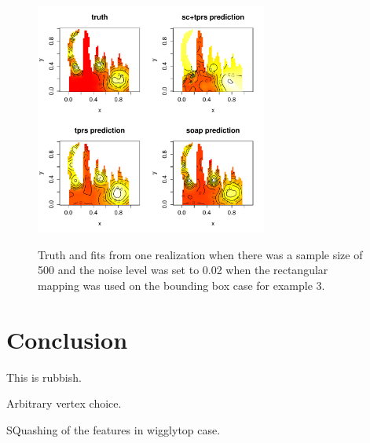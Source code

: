 \documentclass[a4paper,10pt]{amsart}
\begin{document}
\begin{figure}
\centering
\includegraphics[width=3in]{figs-otherdomains/wigglytop2-bbox-real.pdf} \\
\caption{Truth and fits from one realization when there was a sample size of 500 and the noise level was set to 0.02 when the rectangular mapping was used on the bounding box case for example 3.}
\label{wigglytop2-bbox-real}
\end{figure}


\section{Conclusion}

This is rubbish.

Arbitrary vertex choice.

SQuashing of the features in wigglytop case.














\end{document}
